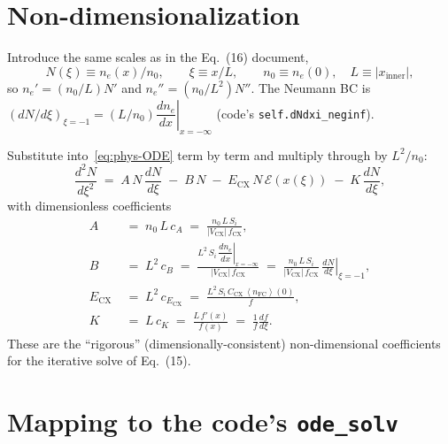\documentclass[11pt]{article}
\renewcommand{\ne}{n_{e}}  %
\newcommand{\nfc}{n_{\mathrm{FC}}}
\newcommand{\Vcx}{\lvert V_{\mathrm{CX}}\rvert}
\newcommand{\Si}{S_{i}}
\newcommand{\fCX}{f_{\mathrm{CX}}}
\newcommand{\fsa}[1]{\left\langle #1 \right\rangle}
\newcommand{\neginf}{x=-\infty}
\newcommand{\dneneg}{\left.\dfrac{d\ne}{dx}\right|_{\neginf}}
\newcommand{\xin}{x_{\mathrm{inner}}}
\newcommand{\nFCzero}{\fsa{\nfc}(0)}
\newcommand{\Ccx}{C_{\mathrm{CX}}}
\newcommand{\Ecx}{E_{\mathrm{CX}}}
\begin{document}
\section{Non-dimensionalization}
\label{sec:nondim}

Introduce the same scales as in the Eq.~(16) document,
\[
  N(\xi)\equiv\ne(x)/n_{0}, \qquad \xi\equiv x/L, \qquad
  n_{0}\equiv\ne(0), \quad L\equiv |\xin|,
\]
so $\ne'=(n_{0}/L)N'$ and $\ne''=(n_{0}/L^{2})N''$.  The Neumann BC is
$(dN/d\xi)_{\xi=-1}=(L/n_{0})\dneneg$ (code's
\texttt{self.dNdxi\_neginf}).

Substitute into~\eqref{eq:phys-ODE} term by term and multiply through by
$L^{2}/n_{0}$:
\begin{equation}
  \boxed{\;
    \frac{d^{2}N}{d\xi^{2}}
      \;=\; A\,N\,\frac{dN}{d\xi}
         \;-\; B\,N
         \;-\; \Ecx\,N\,\mathcal{E}(x(\xi))
         \;-\; K\,\frac{dN}{d\xi},
  \;}
  \label{eq:nondim-ODE}
\end{equation}
with dimensionless coefficients
\begin{align}
  A  &\;=\; n_{0}\,L\,c_A \;=\; \frac{n_{0}\,L\,\Si}{\Vcx\,\fCX}, \label{eq:A}\\[4pt]
  B  &\;=\; L^{2}\,c_B \;=\; \frac{L^{2}\,\Si\,\dneneg}{\Vcx\,\fCX}
          \;=\; \frac{n_{0}\,L\,\Si}{\Vcx\,\fCX}\,
                \left.\frac{dN}{d\xi}\right|_{\xi=-1}, \label{eq:B}\\[4pt]
  \Ecx &\;=\; L^{2}\,c_{\Ecx} \;=\; \frac{L^{2}\,\Si\,\Ccx\,\nFCzero}{f}, \label{eq:Ecx}\\[4pt]
  K  &\;=\; L\,c_K \;=\; \frac{L\,f'(x)}{f(x)} \;=\; \frac{1}{f}\frac{df}{d\xi}. \label{eq:K}
\end{align}
These are the ``rigorous'' (dimensionally-consistent) non-dimensional
coefficients for the iterative solve of Eq.~(15).

\section{Mapping to the code's \texttt{ode\_solv}}
\label{sec:code-map}
\end{document}
